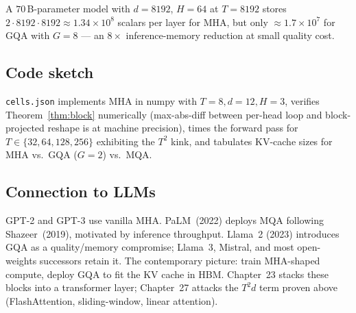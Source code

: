 \begin{example}
A $70$\,B-parameter model with $d = 8192$, $H = 64$ at $T = 8192$ stores $2 \cdot 8192 \cdot 8192 \approx 1.34 \times 10^{8}$ scalars per layer for MHA, but only $\approx 1.7 \times 10^{7}$ for GQA with $G = 8$ --- an $8\times$ inference-memory reduction at small quality cost.
\end{example}

\subsection*{Code sketch}

\texttt{cells.json} implements MHA in numpy with $T = 8, d = 12, H = 3$, verifies Theorem~\ref{thm:block} numerically (max-abs-diff between per-head loop and block-projected reshape is at machine precision), times the forward pass for $T \in \{32, 64, 128, 256\}$ exhibiting the $T^2$ kink, and tabulates KV-cache sizes for MHA vs.\ GQA ($G = 2$) vs.\ MQA.

\subsection*{Connection to LLMs}

GPT-2 and GPT-3 use vanilla MHA. PaLM~(2022) deploys MQA following Shazeer~(2019), motivated by inference throughput. Llama~2 (2023) introduces GQA as a quality/memory compromise; Llama~3, Mistral, and most open-weights successors retain it. The contemporary picture: train MHA-shaped compute, deploy GQA to fit the KV cache in HBM. Chapter~23 stacks these blocks into a transformer layer; Chapter~27 attacks the $T^2 d$ term proven above (FlashAttention, sliding-window, linear attention).
